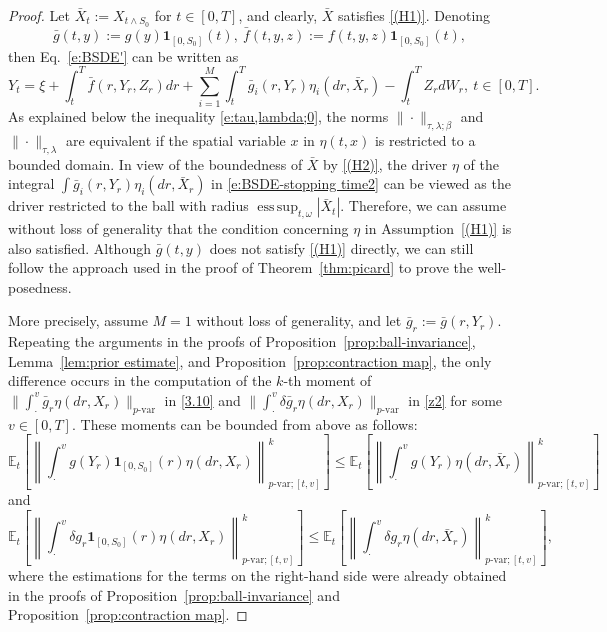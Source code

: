 \documentclass[11pt,reqno]{amsart}
\DeclareMathOperator*{\esssup}{ess\,sup}
\numberwithin{equation}{section}
\begin{document}
\begin{proof}
Let $\bar{X}_{t} :=X_{t\land S_{0}}$ for $t\in[0,T]$, and
clearly, $\bar X$ satisfies \ref{(H1)}. Denoting \[\bar{g}(t,y) := g(y)\mathbf 1_{[0,S_{0}]}(t),\ \bar{f}(t,y,z) := f(t,y,z)\mathbf{1}_{[0,S_{0}]}(t),\] 
then Eq.~\eqref{e:BSDE'} can be written as
\begin{equation}\label{e:BSDE-stopping time2}
Y_{t} = \xi +   \int_{t}^{T}\bar{f}(r,Y_{r},Z_{r})dr + \sum_{i=1}^{M}\int_{t}^{T}\bar{g}_{i}(r,Y_{r})\eta_{i}(dr,\bar{X}_{r}) -\int_{t}^{T} Z_{r} dW_{r},\ t\in[0,T].
\end{equation}
As explained below the inequality \eqref{e:tau,lambda;0}, the norms $\|\cdot\|_{\tau, \lambda;\beta}$ and $\|\cdot\|_{\tau, \lambda}$ are equivalent if the spatial variable $x$ in $\eta(t,x)$ is restricted to a bounded domain. In view of the boundedness of $\bar X$ by \ref{(H2)}, the driver $\eta$ of the integral $\int\bar{g}_{i}(r,Y_{r})\eta_{i}(dr,\bar{X}_{r})$ in \eqref{e:BSDE-stopping time2} can be viewed as the driver restricted to the ball with radius $\esssup_{t,\omega}|\bar{X}_{t}|$. Therefore, we can assume without loss of generality that the condition concerning $\eta$ in Assumption~\ref{(H1)} is also satisfied. Although $\bar{g}(t,y)$ does not satisfy \ref{(H1)} directly, we can still follow the approach used in the proof of Theorem~\ref{thm:picard} to prove the well-posedness. 

More precisely, assume $M=1$ without loss of generality, and let $\bar{g}_{r} := \bar{g}(r,Y_r)$. Repeating the arguments in the proofs of Proposition~\ref{prop:ball-invariance}, Lemma~\ref{lem:prior estimate}, and Proposition~\ref{prop:contraction map}, the only difference occurs in the computation of the $k$-th moment of $\|\int_{\cdot}^{v}\bar{g}_{r}\eta(dr,X_{r})\|_{p\text{-var}}$ in \eqref{3.10} and $\|\int_{\cdot}^{v}\delta\bar{g}_{r}\eta(dr,X_{r})\|_{p\text{-var}}$ in \eqref{z2} for some $v\in[0,T]$. These moments can be bounded from above as follows:
\begin{equation*}
\mathbb{E}_{t}\left[\left\|\int_{\cdot}^{v}g(Y_{r})\mathbf{1}_{[0,S_{0}]}(r)\eta(dr,X_{r})\right\|^{k}_{p\text{-var};[t,v]}\right]\le\mathbb{E}_{t}\left[\left\|\int_{\cdot}^{v}g(Y_{r})\eta(dr,\bar{X}_{r})\right\|^{k}_{p\text{-var};[t,v]}\right]
\end{equation*}
and
\begin{equation*}
\mathbb{E}_{t}\left[\left\|\int_{\cdot}^{v}\delta g_{r}\mathbf{1}_{[0,S_{0}]}(r)\eta(dr,X_{r})\right\|^{k}_{p\text{-var};[t,v]}\right]\le \mathbb{E}_{t}\left[\left\|\int_{\cdot}^{v}\delta g_{r}\eta(dr,\bar{X}_{r})\right\|^{k}_{p\text{-var};[t,v]}\right],
\end{equation*}
where the estimations for the terms on the right-hand side were already obtained in the proofs of Proposition~\ref{prop:ball-invariance} and Proposition~\ref{prop:contraction map}. 
\end{proof}
\end{document}
